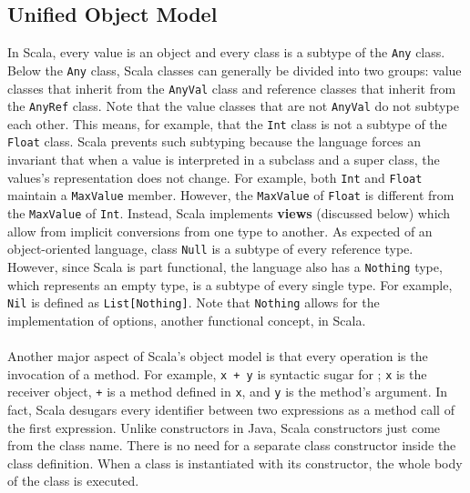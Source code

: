 \documentclass[jou,apacite]{IEEEtran}
\begin{document}
\subsection{Unified Object Model}
In Scala, every value is an object and every class is a subtype of the \texttt{Any} class. Below the \texttt{Any} class, Scala classes can generally be divided into two groups: value classes that inherit from the \texttt{AnyVal} class and reference classes that inherit from the \texttt{AnyRef} class. Note that the value classes that are not \texttt{AnyVal} do not subtype each other. This means, for example, that the \texttt{Int} class is not a subtype of the \texttt{Float} class. Scala prevents such subtyping because the language forces an invariant that when a value is interpreted in a subclass and a super class, the values's representation does not change. For example, both \texttt{Int} and \texttt{Float} maintain a \texttt{MaxValue} member. However, the \texttt{MaxValue} of \texttt{Float} is different from the \texttt{MaxValue} of \texttt{Int}. Instead, Scala implements \textbf{views} (discussed below) which allow from implicit conversions from one type to another. As expected of an object-oriented language, class \texttt{Null} is a subtype of every reference type. However, since Scala is part functional, the language also has a \texttt{Nothing} type, which represents an empty type, is a subtype of every single type. For example, \texttt{Nil} is defined as \texttt{List[Nothing]}. Note that \texttt{Nothing} allows for the implementation of options, another functional concept, in Scala. \\\\
Another major aspect of Scala's object model is that every operation is the invocation of a method. For example, \texttt{x + y} is syntactic sugar for ; \texttt{x} is the receiver object, \texttt{+} is a method defined in \texttt{x}, and \texttt{y} is the method's argument. In fact, Scala desugars every identifier between two expressions as a method call of the first expression. Unlike constructors in Java, Scala constructors just come from the class name. There is no need for a separate class constructor inside the class definition. When a class is instantiated with its constructor, the whole body of the class is executed. 
\end{document}
